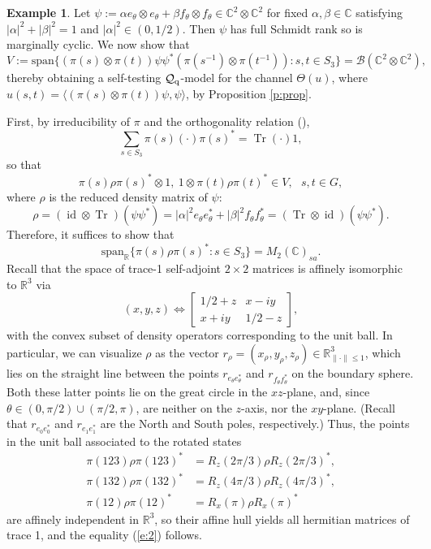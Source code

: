 \documentclass[11pt]{amsart}
\theoremstyle{definition}
\newtheorem{example}[theorem]{Example}
\DeclareMathOperator{\id}{id}
\DeclareMathOperator{\tr}{Tr}
\newcommand{\cl}[1]{\mathcal{#1}}
\newcommand{\la}{\langle}
\newcommand{\ra}{\rangle}
\newcommand{\ten}{\otimes}
\providecommand{\norm}[1]{\lVert#1\rVert}
\begin{document}
\begin{example}
Let $\psi:=\alpha e_\theta\ten e_\theta+\beta f_{\theta}\ten f_{\theta}\in\mathbb{C}^2\ten\mathbb{C}^2$ for fixed $\alpha,\beta\in\mathbb{C}$ satisfying $|\alpha|^2+|\beta|^2=1$ and $|\alpha|^2\in(0,1/2)$. Then $\psi$ has full Schmidt rank so is marginally cyclic. We now show that 
$$V:=\mathrm{span}\{(\pi(s)\ten\pi(t))\psi\psi^*(\pi(s^{-1})\ten\pi(t^{-1}))
: s,t\in S_3\}=\cl{B}(\mathbb{C}^2\ten \mathbb{C}^2),$$
thereby obtaining a self-testing $\cl{Q}_{\rm q}$-model for the channel $\Theta(u)$, where $u(s,t) = \la(\pi(s)\ten\pi(t))\psi,\psi\ra$, by Proposition \ref{p:prop}. 

First, by irreducibility of $\pi$ and the orthogonality relation (\cite[Theorem III.1.1]{simon}), 
$$\sum_{s\in S_3}\pi(s)(\cdot)\pi(s)^*=\tr(\cdot)1,$$
so that 
$$\pi(s)\rho\pi(s)^*\ten 1, \ 1\ten\pi(t)\rho\pi(t)^*\in V, \ \ \ s,t\in G,$$
where $\rho$ is the reduced density matrix of $\psi$:
$$\rho=(\id\ten\tr)(\psi\psi^*) = |\alpha|^2e_\theta e_\theta^*+|\beta|^2f_\theta f_\theta^*=(\tr\ten\id)(\psi\psi^*).$$
Therefore, it suffices to show that \begin{equation}\label{e:2}\mathrm{span}_{\mathbb{R}}\{\pi(s)\rho\pi(s)^* : s\in S_3\}=M_2(\mathbb{C})_{sa}.\end{equation}
Recall that the space of trace-1 self-adjoint $2\times 2$ matrices is affinely isomorphic to $\mathbb{R}^3$ via 
$$(x,y,z)\Leftrightarrow\begin{bmatrix} 1/2+z & x-iy\\x+iy & 1/2-z\end{bmatrix},$$
with the convex subset of density operators corresponding to the unit ball. In particular, we can visualize $\rho$ as the vector $r_\rho=(x_\rho,y_\rho,z_\rho)\in\mathbb{R}^3_{\norm{\cdot}\leq 1}$, which lies on the straight line between the points $r_{e_\theta e_\theta^*}$ and $r_{f_\theta f_\theta^*}$ on the boundary sphere. Both these latter points lie on the great circle in the $xz$-plane, and, since $\theta \in(0,\pi/2)\cup(\pi/2,\pi)$, are neither on the $z$-axis, nor the $xy$-plane. (Recall that $r_{e_0e_0^*}$ and $r_{e_1e_1^*}$ are the North and South poles, respectively.) Thus, the points in the unit ball associated to the rotated states 
\begin{align*}\pi(123)\rho\pi(123)^*&=R_z(2\pi/3)\rho R_z(2\pi/3)^*,\\ 
\pi(132)\rho\pi(132)^*&=R_z(4\pi/3)\rho R_z(4\pi/3)^*,\\
\pi(12)\rho\pi(12)^*&=R_x(\pi)\rho R_x(\pi)^*
\end{align*}
are affinely independent in $\mathbb{R}^3$, so their affine hull yields all hermitian matrices of trace 1, and the equality (\ref{e:2}) follows.
\end{example}
\end{document}
